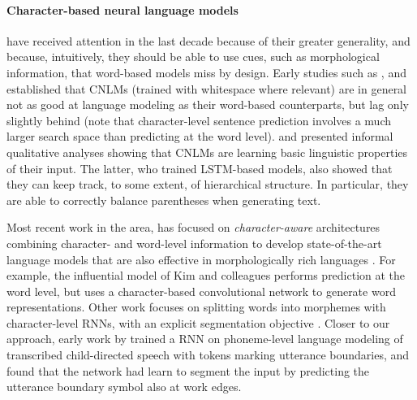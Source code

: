 \paragraph{Character-based neural language models} have received attention in the last
decade because of their greater generality, and because, intuitively, they should be able to
use cues, such as morphological information, that word-based models
miss by design. Early studies such as ,
 and  established
that CNLMs (trained with whitespace where relevant) are in general not
as good at language modeling as their word-based counterparts, but lag
only slightly behind (note that character-level sentence prediction
involves a much larger search space than predicting at the word
level).  and 
presented informal qualitative analyses showing that CNLMs are
learning basic linguistic properties of their input. The latter, who
trained LSTM-based models, also showed that they can keep track, to
some extent, of hierarchical structure. In particular, they are able
to correctly balance parentheses when generating text.

Most recent work in the area, has focused on \emph{character-aware}
architectures combining character- and word-level information to
develop state-of-the-art language models that are also effective in
morphologically rich languages \citep[see, e.g.,][and references
there]{Bojanowski:etal:2016,Kim:etal:2016,Gerz:etal:2018}. For
example, the influential model of Kim and colleagues performs
prediction at the word level, but uses a character-based convolutional
network to generate word representations. Other work focuses on
splitting words into morphemes with character-level RNNs, with an
explicit segmentation objective \cite[e.g.,][]{Kann:etal:2016}. Closer
to our approach, early work by 
trained a RNN on phoneme-level language modeling of transcribed
child-directed speech with tokens marking utterance boundaries, and
found that the network had learn to segment the input by predicting
the utterance boundary symbol also at work edges.



